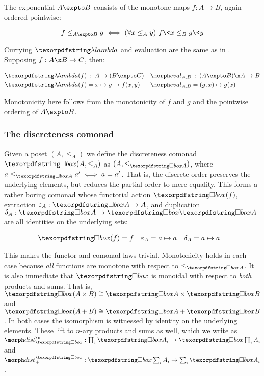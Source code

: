 The exponential $A \expto B$ consists of the monotone maps $f : A \to B$, again
ordered pointwise:

\[ f \le_{A \expto B} g \iff \fa{x \le_A y} f\<x \le_B g\<y \]

\noindent
Currying $\fn$ and evaluation are the same as in \Set. Supposing $f : A \x B \to
C$, then:

\begin{align*}
\fn(f) &\isa A \to (B \expto C) &
\eval_{A,B} &\isa (A \expto B) \x A \to B
\\
\fn(f) &= x \mapsto y \mapsto f(x,y) &
\eval_{A,B} &= (g,x) \mapsto g(x)
\end{align*}

\noindent
Monotonicity here follows from the monotonicity of $f$ and $g$ and the pointwise
ordering of $A \expto B$.


\subsubsection{The discreteness comonad}

Given a poset $(A, \le_A)$ we define the discreteness comonad $\iso(A, \le_A)$
as $(A, \le_{\iso A})$, where \( a \le_{\iso A} a' \iff a = a' \).
%
That is, the discrete order preserves the underlying elements, but reduces the
partial order to mere equality.
%
This forms a rather boring comonad whose functorial action $\iso(f)$, extraction $\varepsilon_A : \iso A \to A$, and duplication $\delta_A : \iso A \to \iso \iso A$ are all identities on the underlying sets:

\begin{align*}
\iso(f) &= f & \varepsilon_A &= a \mapsto a & \delta_A &= a \mapsto a
\end{align*}

\noindent
This makes the functor and comonad laws trivial. Monotonicity holds in each case because \emph{all} functions are monotone with respect to $\le_{\iso A}$.
%
It is also immediate that $\iso$ is monoidal with respect to \emph{both}
products and sums. That is, $\iso (A \times B) \cong \iso A \times \iso B$
and $\iso (A + B) \cong \iso A + \iso B$.
%
In both cases the isomorphism is witnessed by identity on the underlying
elements.
%
These lift to $n$-ary products and sums as well, which we write as $\isox : \prod_i \iso A_i \to \iso\prod_i A_i$ and $\isosum : \iso \sum_i
A_i \to \sum_i \iso A_i$.

